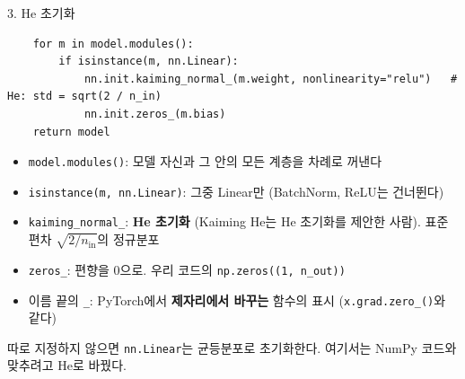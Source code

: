 \documentclass[aspectratio=169,11pt]{beamer}
\newcommand{\code}[1]{\texttt{#1}}
\begin{document}
\begin{frame}[fragile]{3. He 초기화}
\begin{lstlisting}
    for m in model.modules():
        if isinstance(m, nn.Linear):
            nn.init.kaiming_normal_(m.weight, nonlinearity="relu")   # He: std = sqrt(2 / n_in)
            nn.init.zeros_(m.bias)
    return model
\end{lstlisting}
\begin{itemize}
\item \code{model.modules()}: 모델 자신과 그 안의 모든 계층을 차례로 꺼낸다
\item \code{isinstance(m, nn.Linear)}: 그중 Linear만 (BatchNorm, ReLU는 건너뛴다)
\item \code{kaiming\_normal\_}: \textbf{He 초기화} (Kaiming He는 He 초기화를 제안한 사람). 표준편차 $\sqrt{2/n_{\text{in}}}$의 정규분포
\item \code{zeros\_}: 편향을 $0$으로. 우리 코드의 \code{np.zeros((1, n\_out))}
\item 이름 끝의 \code{\_}: PyTorch에서 \textbf{제자리에서 바꾸는} 함수의 표시 (\code{x.grad.zero\_()}와 같다)
\end{itemize}
\begin{remarkbox}
\small 따로 지정하지 않으면 \code{nn.Linear}는 균등분포로 초기화한다. 여기서는 NumPy 코드와 맞추려고 He로 바꿨다.
\end{remarkbox}
\end{frame}
\end{document}
